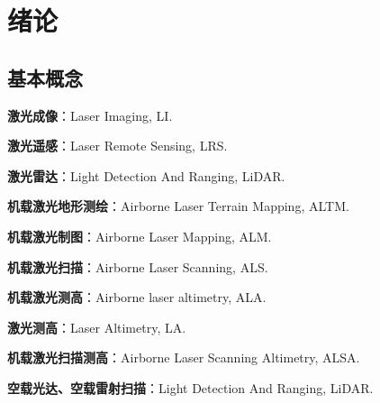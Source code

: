 
\chapter{绪论}
\section{基本概念}
\begin{itemize*}
    \item \textbf{激光成像}：Laser Imaging, LI.
    \item \textbf{激光遥感}：Laser Remote Sensing, LRS.
    \item \textbf{激光雷达}：Light Detection And Ranging, LiDAR.
    \item \textbf{机载激光地形测绘}：Airborne Laser Terrain Mapping, ALTM.
    \item \textbf{机载激光制图}：Airborne Laser Mapping, ALM.
    \item \textbf{机载激光扫描}：Airborne Laser Scanning, ALS.
    \item \textbf{机载激光测高}：Airborne laser altimetry, ALA.
    \item \textbf{激光测高}：Laser Altimetry, LA.
    \item \textbf{机载激光扫描测高}：Airborne Laser Scanning Altimetry, ALSA.
    \item \textbf{空载光达、空载雷射扫描}：Light Detection And Ranging, LiDAR.
\end{itemize*}

